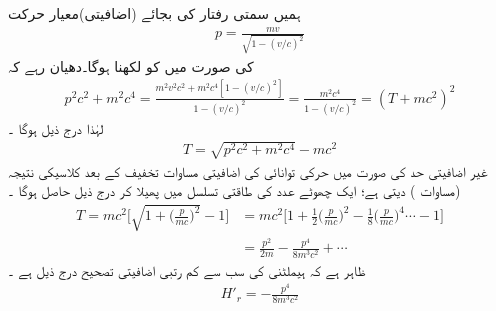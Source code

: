  ہمیں سمتی رفتار کی بجائے   (اضافیتی)معیار حرکت
\begin{align}\label{مساوات_غیر_مضطرب_اضافیتی_معیار_حرکت}
p = \frac{mv}{\sqrt{1 - (v/c)^2}}
\end{align}
 کی صورت میں  کو لکھنا ہوگا۔دھیان رہے کہ
\begin{align*}
p^2 c^2 + m^2 c^4 = \frac{m^2 v^2 c^2 + m^2 c^4 [1 - (v/c)^2]}{1 - (v/c)^2} = \frac{m^2 c^4}{1 - (v/c)^2} = (T + mc^2)^2
\end{align*}
لہٰذا    درج ذیل ہوگا ۔
\begin{align}
T = \sqrt{p^2 c^2 + m^2 c^4} - mc^2
\end{align}
غیر اضافیتی حد  کی صورت میں حرکی توانائی کی اضافیتی مساوات تخفیف کے بعد کلاسیکی نتیجہ  (مساوات )    دیتی ہے؛   ایک چھوٹے 
 عدد  کی طاقتی تسلسل میں پھیلا کر درج ذیل حاصل ہوگا ۔
\begin{align}\label{مساوات_غیر_مضطرب_ٹی}
T = mc^2 \big [ \sqrt{1 + \big(\frac{p}{mc}\big)^2}  - 1 \big ] &= mc^2 \big [ 1 + \frac{1}{2} \big(\frac{p}{mc}\big)^2 - \frac{1}{8} \big(\frac{p}{mc}\big)^4 \cdots - 1 \big ] \nonumber \\
&= \frac{p^2}{2m} - \frac{p^4}{8m^3 c^2} + \cdots 
\end{align}
ظاہر ہے کہ ہیملٹنی کی  سب سے کم رتبی  اضافیتی تصحیح درج ذیل ہے ۔
\begin{align}\label{مساوات_غیر_مضطرب_سب_سے_کم_اضطراب}
H'_r = - \frac{p^4}{8m^3 c^2}
\end{align}

